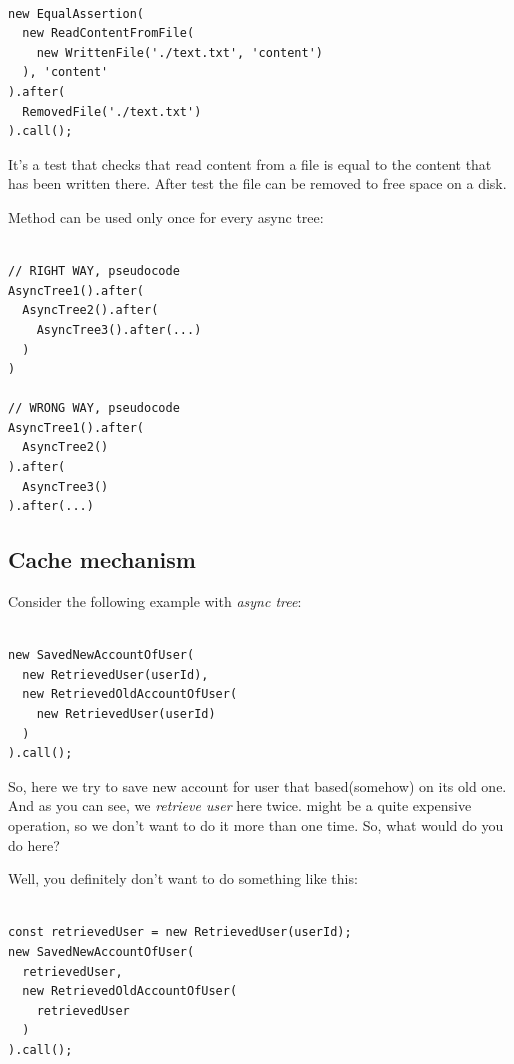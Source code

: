 \documentclass{article}
\newcommand{\cit}[1]{{\fontfamily{qcr}\selectfont{\textit{\textcolor{superdarkgray}{#1}}}}}
\begin{document}
\begin{lstlisting}

new EqualAssertion(
  new ReadContentFromFile(
    new WrittenFile('./text.txt', 'content')
  ), 'content'
).after(
  RemovedFile('./text.txt')
).call();

\end{lstlisting}

It's a test that checks that read content from a file is equal to the content that has been written there. After test the file can be removed to free space on a disk.

Method \cit{after} can be used only once for every async tree:

\begin{lstlisting}

// RIGHT WAY, pseudocode
AsyncTree1().after(
  AsyncTree2().after(
    AsyncTree3().after(...)
  )
)

// WRONG WAY, pseudocode
AsyncTree1().after(
  AsyncTree2()
).after(
  AsyncTree3()
).after(...)

\end{lstlisting}

\subsection{Cache mechanism}

Consider the following example with  \textit{async tree}:

\begin{lstlisting}

new SavedNewAccountOfUser(
  new RetrievedUser(userId),
  new RetrievedOldAccountOfUser(
    new RetrievedUser(userId)
  )
).call();

\end{lstlisting}

So, here we try to save new account for user that based(somehow) on its old one. And as you can see, we \textit{retrieve user} here twice. \cit{RetrievedUser} might be a quite expensive operation, so we don't want to do it more than one time. So, what would do you do here?

\newpage

Well, you definitely don't want to do something like this:

\begin{lstlisting}

const retrievedUser = new RetrievedUser(userId);
new SavedNewAccountOfUser(
  retrievedUser,
  new RetrievedOldAccountOfUser(
    retrievedUser
  )
).call();

\end{lstlisting}
\end{document}
